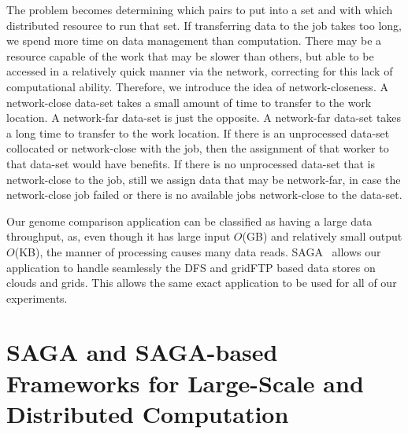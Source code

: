 \documentclass{rspublic}
\newcommand{\micnote}[1]{ {\textcolor{blue} { ***Michael: #1 }}}
\newcommand{\betynote}[1]{ {\textcolor{orange} { ***Bety: #1 }}}
\newcommand{\jhanote}[1]{} \newcommand{\micnote}[1]{}\newcommand{\betynote}[1]{} \newcommand{\fixme}[1]{}
\begin{document}
The problem becomes determining which pairs to put into a set and with which
distributed resource to run that set. If transferring data to the job
takes too long, we spend more time on data management than computation.
There may be a resource capable of the work that may be slower than
others, but able to be accessed in a relatively quick manner via the
network, correcting for this lack of computational ability. Therefore, we introduce the idea of network-closeness. A network-close data-set
takes a small amount of time to transfer to the work location. A
network-far data-set is just the opposite. A network-far data-set takes
a long time to transfer to the work location. If there is an
unprocessed data-set collocated or network-close with the job, then the
assignment of that worker to that data-set would have benefits. If
there is no unprocessed data-set that is network-close to the job, still
we assign data that may be network-far, in case the network-close job
failed or there is no available jobs network-close to the data-set.


Our genome comparison application can be classified as having a large
data throughput, as, even though it has large input $O$(GB) and
relatively small output $O$(KB), the manner of processing causes many
data reads. SAGA~\citep{saga_web} allows our application to handle
seamlessly the DFS and gridFTP based data stores on clouds and grids.
This allows the same exact application to be used for all of our
experiments. 

\section{SAGA and SAGA-based Frameworks for Large-Scale and
  Distributed Computation}\label{Sec:SAGA}

\end{document}
